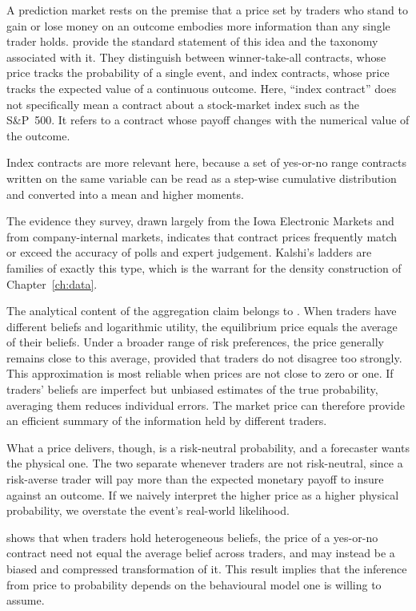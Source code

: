 \documentclass[12pt,a4paper]{report}
\begin{document}
A prediction market rests on the premise that a price set by traders who stand
to gain or lose money on an outcome embodies more information than any single
trader holds. \textcite{wolfers2004} provide the
standard statement of this idea and the taxonomy associated with it. They
distinguish between winner-take-all contracts, whose price tracks the probability
of a single event, and index contracts, whose price tracks the expected value of
a continuous outcome. Here, ``index contract'' does not specifically mean a
contract about a stock-market index such as the S\&P~500. It refers to a
contract whose payoff changes with the numerical value of the outcome.

Index contracts are more relevant here,
because a set of yes-or-no range contracts written on the same variable
can be read as a step-wise cumulative distribution and converted into a
mean and higher moments.

The evidence they survey, drawn largely from the
Iowa Electronic Markets and from company-internal markets, indicates that
contract prices frequently match or exceed the accuracy of polls and
expert judgement. Kalshi's ladders are families of
exactly this type, which is the warrant for the density construction of
Chapter~\ref{ch:data}.

The analytical content of the aggregation claim belongs to
\textcite{wolfers2006}. When traders have different beliefs and logarithmic utility, the equilibrium price equals the average of their beliefs. Under a broader range of risk preferences, the price generally remains close to this average, provided that traders do not disagree too strongly. This approximation is most reliable when prices are not close to zero or one. If traders’ beliefs are imperfect but unbiased estimates of the true probability, averaging them reduces individual errors. The market price can therefore provide an efficient summary of the information held by different traders.

What a price delivers, though, is a risk-neutral probability, and a forecaster
wants the physical one. The two separate whenever traders are not
risk-neutral, since a risk-averse trader will pay more than the expected monetary payoff to insure against an outcome. If we naively interpret the higher price as a higher physical probability, we overstate the event’s real-world likelihood.

\textcite{manski2006} shows that when traders hold heterogeneous beliefs, the
price of a yes-or-no contract need not equal the average belief across
traders, and may instead be a biased and compressed transformation of it.
This result implies that
the inference from price to probability depends on the behavioural model
one is willing to assume.
\end{document}
